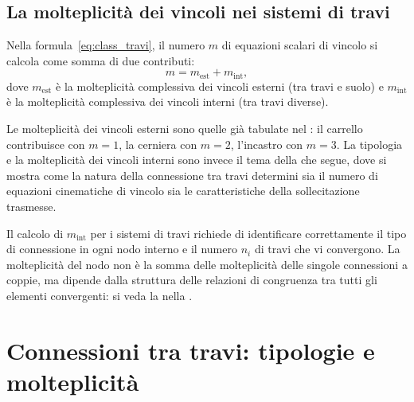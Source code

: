 \subsection{La molteplicità dei vincoli nei sistemi di travi}
\label{subsec:molt_travi}

Nella formula~\eqref{eq:class_travi}, il numero $m$ di
equazioni scalari di vincolo si calcola come somma
di due contributi:
\begin{equation}\label{eq:m_travi}
	m = m_{\text{est}} + m_{\text{int}},
\end{equation}
dove $m_{\text{est}}$ è la molteplicità complessiva dei
vincoli esterni (tra travi e suolo) e $m_{\text{int}}$ è la
molteplicità complessiva dei vincoli interni (tra travi
diverse).

Le molteplicità dei vincoli esterni sono quelle già
tabulate nel : il carrello contribuisce
con $m = 1$, la cerniera con $m = 2$, l'incastro con
$m = 3$. La tipologia e la molteplicità dei vincoli interni
sono invece il tema della  che segue,
dove si mostra come la natura della connessione tra travi
determini sia il numero di equazioni cinematiche di vincolo
sia le caratteristiche della sollecitazione trasmesse.

\begin{oss}
	Il calcolo di $m_{\text{int}}$ per i sistemi di travi
	richiede di identificare correttamente il tipo di
	connessione in ogni nodo interno e il numero $n_i$
	di travi che vi convergono. La molteplicità del nodo
	non è la somma delle molteplicità delle singole
	connessioni a coppie, ma dipende dalla struttura
	delle relazioni di congruenza tra tutti gli elementi
	convergenti: si veda la  nella
	.
\end{oss}


\section{Connessioni tra travi: tipologie e molteplicità}
\label{sec:connessioni}

